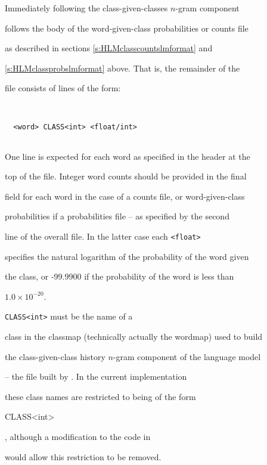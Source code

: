 Immediately following the class-given-classes $n$-gram component


follows the body of the word-given-class probabilities or counts file


as described in sections \ref{s:HLMclasscountslmformat} and


\ref{s:HLMclassprobslmformat} above.  That is, the remainder of the


file consists of lines of the form:


\begin{verbatim}


  <word> CLASS<int> <float/int>


\end{verbatim}


One line is expected for each word as specified in the header at the


top of the file.  Integer word counts should be provided in the final


field for each word in the case of a counts file, or word-given-class


probabilities if a probabilities file -- as specified by the second


line of the overall file.  In the latter case each {\tt <float>}


specifies the natural logarithm of the probability of the word given


the class, or -99.9900 if the probability of the word is less than


$1.0\times10^{-20}$.





{\tt CLASS<int>} must be the name of a


class in the classmap (technically actually the wordmap) used to build


the class-given-class history $n$-gram component of the language model


-- the file built by .  In the current implementation


these class names are restricted to being of the form {\tt


CLASS<int>}, although a modification to the code in 


would allow this restriction to be removed.










